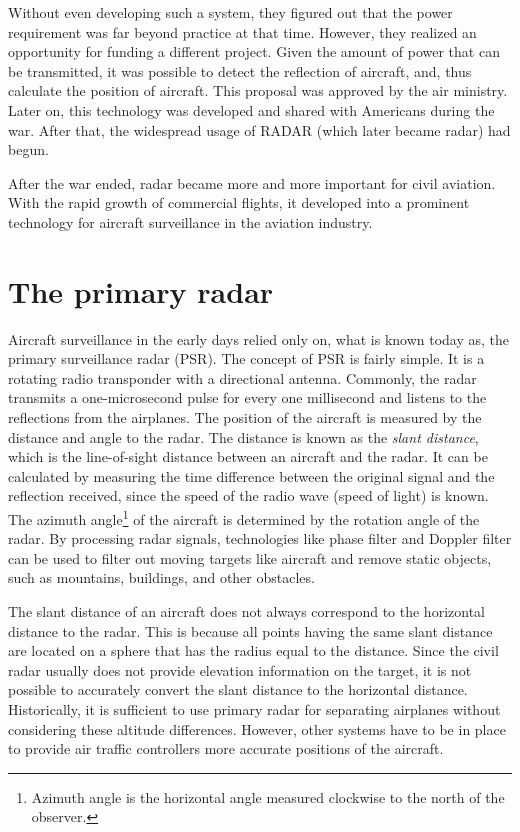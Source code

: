 Without even developing such a system, they figured out that the power requirement was far beyond practice at that time. However, they realized an opportunity for funding a different project. Given the amount of power that can be transmitted, it was possible to detect the reflection of aircraft, and, thus calculate the position of aircraft. This proposal was approved by the air ministry. Later on, this technology was developed and shared with Americans during the war. After that, the widespread usage of RADAR (which later became radar) had begun.

After the war ended, radar became more and more important for civil aviation. With the rapid growth of commercial flights, it developed into a prominent technology for aircraft surveillance in the aviation industry.

\section{The primary radar}

Aircraft surveillance in the early days relied only on, what is known today as, the primary surveillance radar (PSR). The concept of PSR is fairly simple. It is a rotating radio transponder with a directional antenna. Commonly, the radar transmits a one-microsecond pulse for every one millisecond and listens to the reflections from the airplanes. The position of the aircraft is measured by the distance and angle to the radar. The distance is known as the \emph{slant distance}, which is the line-of-sight distance between an aircraft and the radar. It can be calculated by measuring the time difference between the original signal and the reflection received, since the speed of the radio wave (speed of light) is known. The azimuth angle\footnote{Azimuth angle is the horizontal angle measured clockwise to the north of the observer.} of the aircraft is determined by the rotation angle of the radar. By processing radar signals, technologies like phase filter and Doppler filter can be used to filter out moving targets like aircraft and remove static objects, such as mountains, buildings, and other obstacles.

The slant distance of an aircraft does not always correspond to the horizontal distance to the radar. This is because all points having the same slant distance are located on a sphere that has the radius equal to the distance. Since the civil radar usually does not provide elevation information on the target, it is not possible to accurately convert the slant distance to the horizontal distance. Historically, it is sufficient to use primary radar for separating airplanes without considering these altitude differences. However, other systems have to be in place to provide air traffic controllers more accurate positions of the aircraft.

